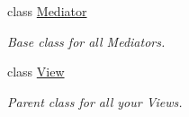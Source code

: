 \begin{DoxyCompactItemize}
class \hyperlink{classstrange_1_1extensions_1_1mediation_1_1impl_1_1_mediator}{Mediator}
\begin{DoxyCompactList}\small\item\em Base class for all Mediators. \end{DoxyCompactList}\item 
class \hyperlink{classstrange_1_1extensions_1_1mediation_1_1impl_1_1_view}{View}
\begin{DoxyCompactList}\small\item\em Parent class for all your Views. \end{DoxyCompactList}\end{DoxyCompactItemize}
